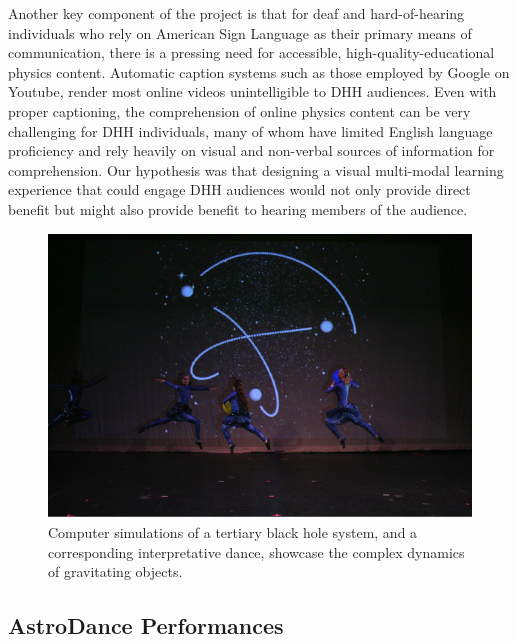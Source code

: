 \documentclass[11.5pt]{sig-alternate} %
\begin{document}
\begin{large}
Another key component of the project is that for deaf and hard-of-hearing individuals who rely on American Sign Language as their primary means of communication, there is a pressing need for accessible, high-quality-educational physics content.  Automatic caption systems such as those employed by Google on Youtube, render most online videos unintelligible to DHH audiences. Even with proper captioning, the comprehension of online physics content can be very challenging for DHH individuals, many of whom have limited English language proficiency and rely heavily on visual and non-verbal sources of information for comprehension.  Our hypothesis was that designing a visual multi-modal learning experience that could engage DHH audiences would not only provide direct benefit but might also provide benefit to hearing members of the audience.

\begin{figure}[h]
    \centering
    \includegraphics[width=1\linewidth]{Fig_1.png}
    \caption{Computer simulations of a tertiary black hole system, and a corresponding interpretative dance, showcase the complex dynamics of gravitating objects.}
\end{figure}

\subsection*{AstroDance Performances}


\end{large}
\end{document}
